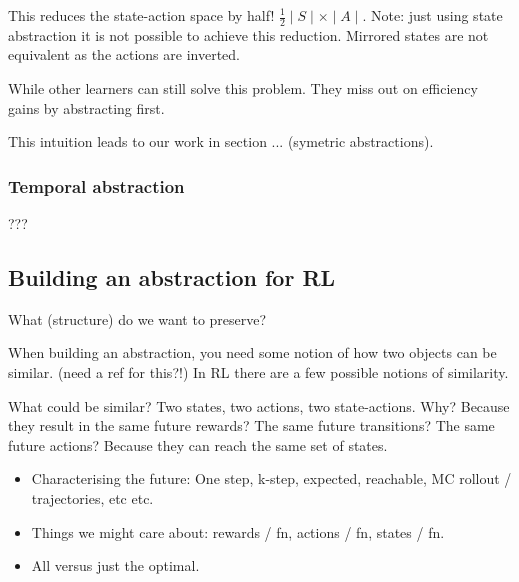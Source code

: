 This reduces the state-action space by half!
\(\frac{1}{2}\mid S \mid \times \mid A \mid\). Note: just using state
abstraction it is not possible to achieve this reduction. Mirrored
states are not equivalent as the actions are inverted.

While other learners can still solve this problem. They miss out on
efficiency gains by abstracting first.

This intuition leads to our work in section ... (symetric abstractions).

\subsubsection{Temporal abstraction}

???



\subsection{Building an abstraction for RL}

What (structure) do we want to preserve?





When building an abstraction, you need some notion of how two objects can be similar. (need a ref for this?!)
In RL there are a few possible notions of similarity.

What could be similar? Two states, two actions, two state-actions. Why?
Because they result in the same future rewards? The same future transitions? The same future actions?
Because they can reach the same set of states.

\begin{itemize}
  \tightlist
  \item Characterising the future: One step, k-step, expected, reachable, MC rollout / trajectories, etc etc.
  \item Things we might care about: rewards / fn, actions / fn, states / fn.
  \item All versus just the optimal.
\end{itemize}

